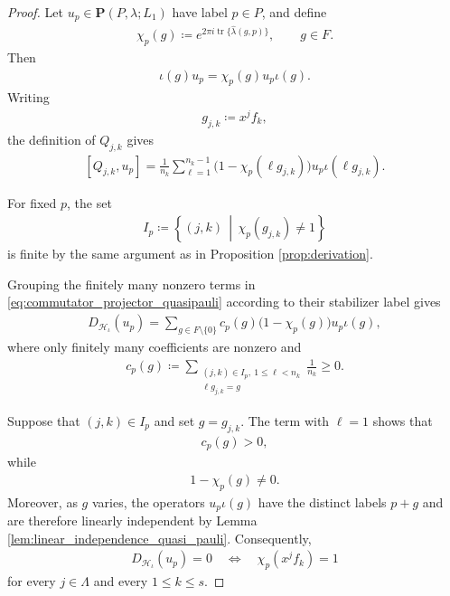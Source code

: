 \documentclass[10pt,a4paper]{amsart}
\def\CH {{\mathcal H}}
\def\La{{\Lambda}}
\def\hl{{\hat \lambda}}
\def\l{{\lambda}}
\def\tr{\operatorname{tr}}
\begin{document}
\begin{proof}
Let $u_p\in\textbf{P}(P,\l;L_1)$ have label $p\in P$, and define
\begin{align}
    \chi_p(g)
    \coloneqq
    e^{2\pi i\tr\{\hl(g,p)\}},
    \qquad g\in F.
\end{align}
Then
\begin{align}
    \iota(g)u_p=\chi_p(g)u_p\iota(g).
\end{align}
Writing
\begin{align}
    g_{j,k}\coloneqq x^jf_k,
\end{align}
the definition of $Q_{j,k}$ gives
\begin{align}\label{eq:commutator_projector_quasipauli}
    [Q_{j,k},u_p]
    =
    \frac{1}{n_k}
    \sum_{\ell=1}^{n_k-1}
    \bigl(1-\chi_p(\ell g_{j,k})\bigr)
    u_p\iota(\ell g_{j,k}).
\end{align}

For fixed $p$, the set
\begin{align}
    I_p
    \coloneqq
    \left\{
        (j,k)
        \,\middle|\,
        \chi_p(g_{j,k})\neq1
    \right\}
\end{align}
is finite by the same argument as in Proposition \ref{prop:derivation}.

Grouping the finitely many nonzero terms in
\eqref{eq:commutator_projector_quasipauli} according to their stabilizer
label gives
\begin{align}\label{eq:derivation_grouped_by_stabilizer_label}
    D_{\CH_{\iota}}(u_p)
    =
    \sum_{g\in F\setminus\{0\}}
    c_p(g)
    \bigl(1-\chi_p(g)\bigr)
    u_p\iota(g),
\end{align}
where only finitely many coefficients are nonzero and
\begin{align}
    c_p(g)
    \coloneqq
    \sum_{\substack{
        (j,k)\in I_p,\ 1\leqslant\ell<n_k\\
        \ell g_{j,k}=g
    }}
    \frac{1}{n_k}
    \geqslant0.
\end{align}

Suppose that $(j,k)\in I_p$ and set $g=g_{j,k}$. The term with
$\ell=1$ shows that
\begin{align}
    c_p(g)>0,
\end{align}
while
\begin{align}
    1-\chi_p(g)\neq0.
\end{align}
Moreover, as $g$ varies, the operators $u_p\iota(g)$ have the distinct
labels $p+g$ and are therefore linearly independent by Lemma \ref{lem:linear_independence_quasi_pauli}. Consequently,
\begin{align}
    D_{\CH_{\iota}}(u_p)=0
    \quad\Longleftrightarrow\quad
    \chi_p(x^jf_k)=1
\end{align}
for every $j\in\La$ and every $1\leqslant k\leqslant s$.


\end{proof}
\end{document}
